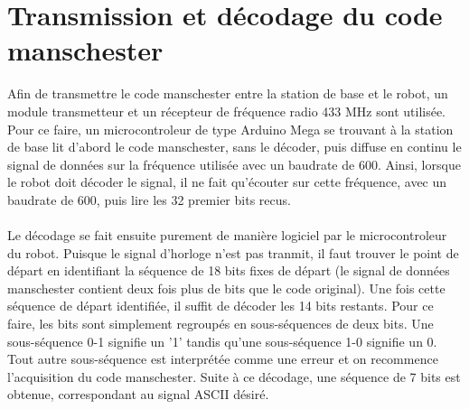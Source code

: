 \section{Transmission et décodage du code manschester}

Afin de transmettre le code manschester entre la station de base et le robot, un module transmetteur et un récepteur de fréquence radio 433 MHz sont utilisée. Pour ce faire, un microcontroleur de type Arduino Mega se trouvant à la station de base lit d'abord le code manschester, sans le décoder, puis diffuse en continu le signal de données sur la fréquence utilisée avec un baudrate de 600. Ainsi, lorsque le robot doit décoder le signal, il ne fait qu'écouter sur cette fréquence, avec un baudrate de 600, puis lire les 32 premier bits recus.
\paragraph{}
Le décodage se fait ensuite purement de manière logiciel par le microcontroleur du robot. Puisque le signal d'horloge n'est pas tranmit, il faut trouver le point de départ en identifiant la séquence de 18 bits fixes de départ (le signal de données manschester contient deux fois plus de bits que le code original). Une fois cette séquence de départ identifiée, il suffit de décoder les 14 bits restants. Pour ce faire, les bits sont simplement regroupés en sous-séquences de deux bits. Une sous-séquence 0-1 signifie un '1' tandis qu'une sous-séquence 1-0 signifie un 0. Tout autre sous-séquence est interprétée comme une erreur et on recommence l'acquisition du code manschester. Suite à ce décodage, une séquence de 7 bits est obtenue, correspondant au signal ASCII désiré.